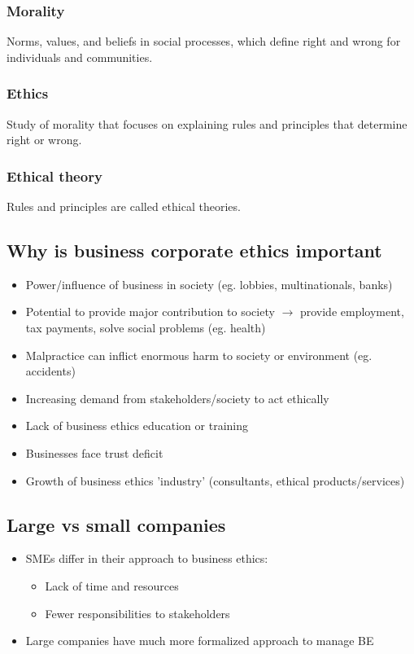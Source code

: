 \documentclass{article}
\begin{document}
\subsubsection{Morality}
Norms, values, and beliefs in social processes, which define right
and wrong for individuals and communities.

\subsubsection{Ethics}
Study of morality that focuses on explaining rules and principles that
determine right or wrong.

\subsubsection{Ethical theory}
Rules and principles are called ethical theories.

\subsection{Why is business corporate ethics important}
\begin{itemize}
    \item Power/influence of business in society (eg. lobbies, multinationals, banks)
    \item Potential to provide major contribution to society $\to$ provide employment, tax payments, solve social problems (eg. health)
    \item Malpractice can inflict enormous harm to society or environment (eg. accidents)
    \item Increasing demand from stakeholders/society to act ethically
    \item Lack of business ethics education or training
    \item Businesses face trust deficit
    \item Growth of business ethics 'industry' (consultants, ethical products/services)
\end{itemize}

\subsection{Large vs small companies}
\begin{itemize}
    \item SMEs differ in their approach to business ethics:
    \begin{itemize}[label=$\to$]
        \item Lack of time and resources
        \item Fewer responsibilities to stakeholders
    \end{itemize}
    \item Large companies have much more formalized approach to manage BE
\end{itemize}
\end{document}
